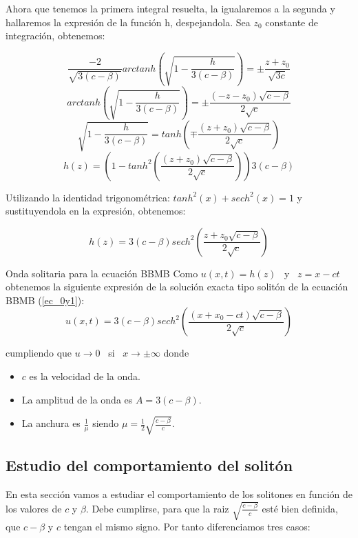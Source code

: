 Ahora que tenemos la primera integral resuelta, la igualaremos a la segunda y hallaremos la expresión de la función h, despejandola. Sea $z_{0}$ constante de integración, obtenemos:

$$\frac{-2}{\sqrt{3(c-\beta)}}arctanh\left(\sqrt{1-\frac{h}{3(c-\beta)}}\right)=\pm \frac{z+z_{0}}{\sqrt{3c}}$$
$$arctanh\left(\sqrt{1-\frac{h}{3(c-\beta)}}\right)=\pm \frac{(-z-z_{0})\sqrt{c-\beta}}{2\sqrt{c}}$$
$$\sqrt{1-\frac{h}{3(c-\beta)}}=tanh\left(\mp \frac{ (z+z_{0})\sqrt{c-\beta}}{2\sqrt{c}}\right)$$
$$h(z)=\left( 1-tanh^{2}\left(\frac{(z+z_{0})\sqrt{c-\beta}}{2\sqrt{c}}\right) \right)3(c-\beta)$$

Utilizando la identidad trigonométrica: $tanh^{2}(x)+sech^{2}(x)=1$ y sustituyendola en la expresión, obtenemos:

$$h(z)=3(c-\beta)sech^{2}\left(\frac{z+z_{0}\sqrt{c-\beta}}{2\sqrt{c}}\right)$$

\begin{definicion1}[label={definicion},nameref={Title or anything else}]{Onda solitaria para la ecuación BBMB}
    Como $u(x,t)=h(z)$ \  y \ $z=x-ct$ obtenemos la siguiente expresión de la solución exacta  tipo solitón de la ecuación BBMB (\ref{ec_0y1}):
    \begin{equation}
        u(x,t)=3(c-\beta)sech^{2}\left(\frac{(x+x_{0}-ct)\sqrt{c-\beta}}{2\sqrt{c}}\right)
    \end{equation}\label{SolucionExacta}

    cumpliendo que $u\longrightarrow 0$ \ si \ $x \longrightarrow \pm \infty$ donde
    \begin{itemize}
        \item $c$ es la velocidad de la onda.
        \item La amplitud de la onda es $A=3(c-\beta)$.
        \item La anchura es $\frac{1}{\mu}$ siendo $\mu=\frac{1}{2}\sqrt{\frac{c-\beta}{c}}$.
    \end{itemize}
    
\end{definicion1}

\subsection{Estudio del comportamiento del solitón}\label{comportamiento}

En esta sección vamos a estudiar el comportamiento de los solitones en función de los valores de $c$ y $\beta$. Debe cumplirse, para que la raiz $\sqrt{\frac{c-\beta}{c}}$ esté bien definida, que $c-\beta$ y $c$ tengan el mismo signo. Por tanto diferenciamos tres casos:

